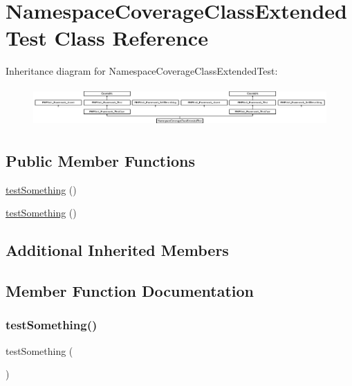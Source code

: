 \hypertarget{class_namespace_coverage_class_extended_test}{}\section{Namespace\+Coverage\+Class\+Extended\+Test Class Reference}
\label{class_namespace_coverage_class_extended_test}
Inheritance diagram for Namespace\+Coverage\+Class\+Extended\+Test\+:\begin{figure}[H]
\begin{center}
\leavevmode
\includegraphics[height=1.505376cm]{class_namespace_coverage_class_extended_test}
\end{center}
\end{figure}
\subsection*{Public Member Functions}
\begin{DoxyCompactItemize}
\item 
\mbox{\hyperlink{class_namespace_coverage_class_extended_test_a0fc4e17369bc9607ebdd850d9eda8167}{test\+Something}} ()
\item 
\mbox{\hyperlink{class_namespace_coverage_class_extended_test_a0fc4e17369bc9607ebdd850d9eda8167}{test\+Something}} ()
\end{DoxyCompactItemize}
\subsection*{Additional Inherited Members}


\subsection{Member Function Documentation}
\mbox{\label{class_namespace_coverage_class_extended_test_a0fc4e17369bc9607ebdd850d9eda8167}} 
\subsubsection{\texorpdfstring{test\+Something()}{testSomething()}\hspace{0.1cm}{\footnotesize\ttfamily [1/2]}}
{\footnotesize\ttfamily test\+Something (\begin{DoxyParamCaption}{ }\end{DoxyParamCaption})}

